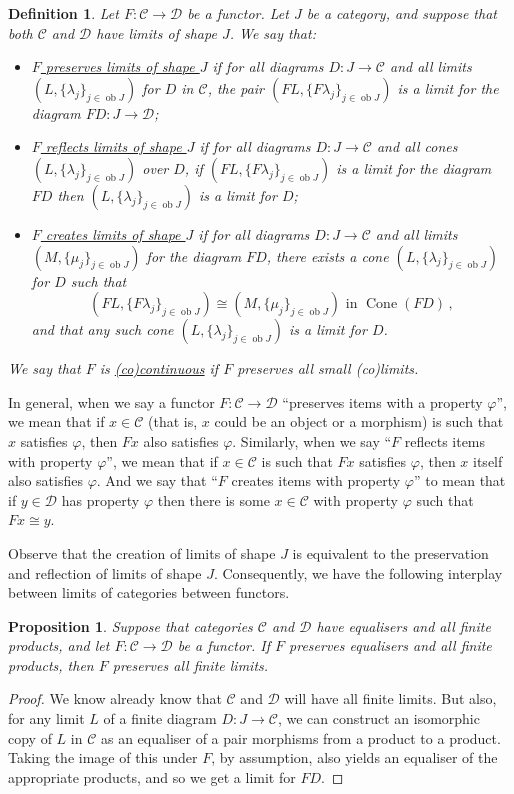 \documentclass[a4paper,11pt]{article}
\theoremstyle{break_italics}
\newtheorem*{proposition*}{Proposition}
\newtheorem*{definition*}{Definition}
\theoremstyle{break_upright}
\theoremstyle{remark}
\newcommand{\ob}{\operatorname{ob}}
\newcommand{\C}{\mathcal{C}}
\newcommand{\D}{\mathcal{D}}
\begin{document}
\begin{definition*}
	Let $F \colon \C \to \D$ be a functor. Let $J$ be a category, and suppose that both $\C$ and $\D$ have limits of shape $J$. We say that:
	\begin{itemize}
		\item \uline{$F$ preserves limits of shape $J$} if for all diagrams $D \colon J \to \C$ and all limits $(L, \{\lambda_j\}_{j\in\ob J})$ for $D$ in $\C$, the pair $(FL, \{F\lambda_j\}_{j \in \ob J})$ is a limit for the diagram $FD \colon J \to \D$;
		\item \uline{$F$ reflects limits of shape $J$} if for all diagrams $D \colon J \to \C$ and all cones $(L, \{\lambda_j\}_{j\in\ob J})$ over $D$, if $(FL, \{F\lambda_j\}_{j\in\ob J})$ is a limit for the diagram $FD$ then $(L, \{\lambda_j\}_{j\in\ob J})$ is a limit for $D$;
		\item \uline{$F$ creates limits of shape $J$} if for all diagrams $D \colon J \to \C$ and all limits $(M, \{\mu_j\}_{j\in\ob J})$ for the diagram $FD$, there exists a cone $(L, \{\lambda_j\}_{j\in\ob J})$ for $D$ such that
			\[
				(FL, \{F\lambda_j\}_{j\in\ob J}) \cong (M, \{\mu_j\}_{j\in\ob J}) \text{ in } \operatorname{Cone}(FD)\,,
			\]
			and that any such cone $(L, \{\lambda_j\}_{j\in\ob J})$ is a limit for $D$.
	\end{itemize}
	We say that $F$ is \uline{(co)continuous} if $F$ preserves all small (co)limits.
\end{definition*}

In general, when we say a functor $F \colon \C \to \D$ ``preserves items with a property $\varphi$'', we mean that if $x \in \C$ (that is, $x$ could be an object or a morphism) is such that $x$ satisfies $\varphi$, then $Fx$ also satisfies $\varphi$. Similarly, when we say ``$F$ reflects items with property $\varphi$'', we mean that if $x \in \C$ is such that $Fx$ satisfies $\varphi$, then $x$ itself also satisfies $\varphi$. And we say that ``$F$ creates items with property $\varphi$'' to mean that if $y \in \D$ has property $\varphi$ then there is some $x \in \C$ with property $\varphi$ such that $Fx \cong y$.

Observe that the creation of limits of shape $J$ is equivalent to the preservation and reflection of limits of shape $J$. Consequently, we have the following interplay between limits of categories between functors.

\begin{proposition*}
	Suppose that categories $\C$ and $\D$ have equalisers and all finite products, and let $F \colon \C \to \D$ be a functor. If $F$ preserves equalisers and all finite products, then $F$ preserves all finite limits.
\end{proposition*}
\begin{proof}
We know already know that $\C$ and $\D$ will have all finite limits. But also, for any limit $L$ of a finite diagram $D \colon J \to \C$, we can construct an isomorphic copy of $L$ in $\C$ as an equaliser of a pair morphisms from a product to a product. Taking the image of this under $F$, by assumption, also yields an equaliser of the appropriate products, and so we get a limit for $FD$.
\end{proof}
\end{document}
